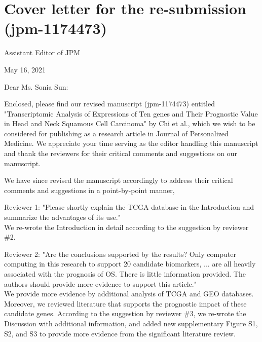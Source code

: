 \documentclass[preprint,12pt]{elsarticle}
\begin{document}
\section*{Cover letter for the re-submission (jpm-1174473)} 
 


Assistant Editor of JPM%

May 16, 2021

Dear Ms. Sonia Sun:

Enclosed, please find our revised manuscript (jpm-1174473) entitled "Transcriptomic Analysis of Expressions of Ten genes and Their Prognostic Value in Head and Neck Squamous Cell Carcinoma" by Chi et al., which we wish to be considered for publishing as a research article in Journal of Personalized Medicine. We appreciate your time serving as the editor handling this manuscript and thank the reviewers for their critical comments and suggestions on our manuscript.

We have since revised the manuscript accordingly to address their critical comments and suggestions in a point-by-point manner, 


Reviewer 1: %
"Please shortly explain the TCGA database in the Introduction and summarize the advantages of its use."\\
We re-wrote the Introduction in detail according to the suggestion by reviewer \#2. %

Reviewer 2: %
"Are the conclusions supported by the results?
Only computer computing in this research to support 20 candidate biomarkers, ... are all heavily associated with the prognosis of OS.
There is little information provided. The authors should provide more evidence to support this article."\\
We provide more evidence by additional analysis of TCGA and GEO databases. Moreover, we reviewed literature that supports the prognostic impact of these candidate genes.
According to the suggestion by reviewer \#3,
we re-wrote the Discussion with additional information, and
added new supplementary Figure S1, S2, and S3 %
to provide more evidence from the significant literature review.
\end{document}
